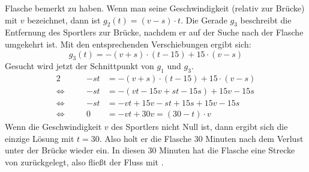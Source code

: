 \begin{exercise}
    Flasche bemerkt zu haben. Wenn man seine Geschwindigkeit (relativ
    zur Brücke) mit $v$ bezeichnet, dann ist $g_{2}(t)=(v-s)\cdot t$.
    Die Gerade $g_{3}$ beschreibt die Entfernung des Sportlers zur Brücke,
    nachdem er auf der Suche nach der Flasche umgekehrt ist. Mit den
    entsprechenden Verschiebungen ergibt sich:
    \begin{equation*}
      g_{3}(t)=-(v+s)\cdot(t-15)+15\cdot(v-s)
    \end{equation*}
    Gesucht wird jetzt der Schnittpunkt von $g_{1}$ und $g_{3}$.
    \newcommand{\aq}{\Leftrightarrow}%
    \begin{alignat*}{2}
         &\quad & -st&=-(v+s)\cdot(t-15)+15\cdot(v-s) \\
      \aq&\quad & -st&=-(vt-15v+st-15s)+15v-15s \\
      \aq&\quad & -st&=-vt+15v-st+15s+15v-15s \\
      \aq&\quad &   0&=-vt+30v=(30-t)\cdot v
    \end{alignat*}
    Wenn die Geschwindigkeit $v$ des Sportlers nicht Null ist,
    dann ergibt sich die einzige Lösung mit $t=30$. Also holt
    er die Flasche 30 Minuten nach dem Verlust unter der Brücke
    wieder ein.
    In diesen 30 Minuten hat die Flasche eine Strecke von 
    zurückgelegt, also fließt der Fluss mit .
  \fi
\end{exercise}

